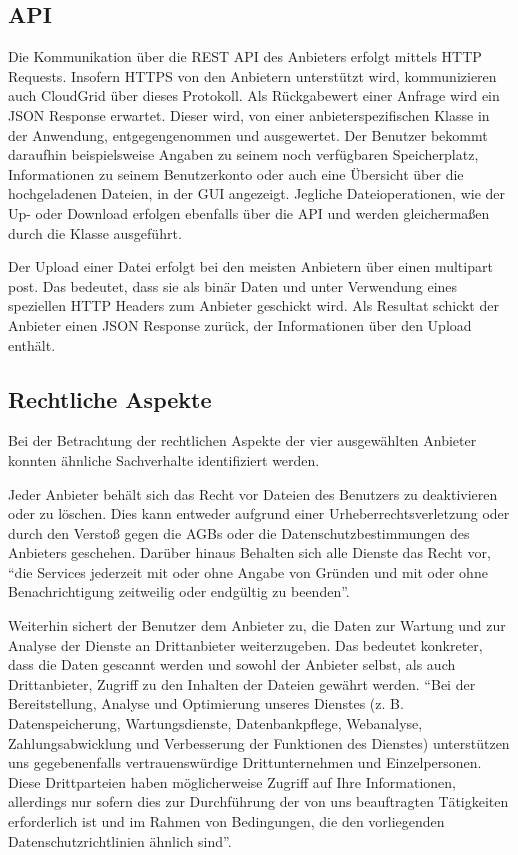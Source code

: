 \subsection{API}
\label{systementwurf-api}
Die Kommunikation über die \ac{REST} \ac{API} des Anbieters erfolgt mittels \ac{HTTP} Requests.
Insofern \ac{HTTPS} von den Anbietern unterstützt wird, kommunizieren auch CloudGrid über dieses Protokoll.
Als Rückgabewert einer Anfrage wird ein \ac{JSON} Response erwartet.
Dieser wird, von einer anbieterspezifischen Klasse in der Anwendung, entgegengenommen und ausgewertet.
Der Benutzer bekommt daraufhin beispielsweise Angaben zu seinem noch verfügbaren Speicherplatz, Informationen zu seinem Benutzerkonto oder auch eine Übersicht über die hochgeladenen Dateien, in der \ac{GUI} angezeigt.
Jegliche Dateioperationen, wie der Up- oder Download erfolgen ebenfalls über die \ac{API} und werden gleichermaßen durch die Klasse ausgeführt.

Der Upload einer Datei erfolgt bei den meisten Anbietern über einen \frqq multipart post\flqq\cite{multi95}.
Das bedeutet, dass sie als binär Daten und unter Verwendung eines speziellen \ac{HTTP} Headers zum Anbieter geschickt wird.
Als Resultat schickt der Anbieter einen JSON Response zurück, der Informationen über den Upload enthält.

\subsection{Rechtliche Aspekte}
\label{systementwurf-recht}
Bei der Betrachtung der rechtlichen Aspekte der vier ausgewählten Anbieter konnten ähnliche Sachverhalte identifiziert werden.

Jeder Anbieter behält sich das Recht vor Dateien des Benutzers zu deaktivieren oder zu löschen.
Dies kann entweder aufgrund einer Urheberrechtsverletzung oder durch den Verstoß gegen die \acp{AGB} oder die Datenschutzbestimmungen des Anbieters geschehen\cite[vgl.][]{box-terms, drop12, goog11, skyd12}.
Darüber hinaus Behalten sich alle Dienste das Recht vor, "`die Services jederzeit mit oder ohne Angabe von Gründen und mit oder ohne Benachrichtigung zeitweilig oder endgültig zu beenden"'\cite{drop12}.

Weiterhin sichert der Benutzer dem Anbieter zu, die Daten zur Wartung und zur Analyse der Dienste an Drittanbieter weiterzugeben\cite[vgl.][]{box-terms, drop13, goog11, skyd12}.
Das bedeutet konkreter, dass die Daten gescannt werden und sowohl der Anbieter selbst, als auch Drittanbieter, Zugriff zu den Inhalten der Dateien gewährt werden.
"`Bei der Bereitstellung, Analyse und Optimierung unseres Dienstes (z. B. Datenspeicherung, Wartungsdienste, Datenbankpflege, Webanalyse, Zahlungsabwicklung und Verbesserung der Funktionen des Dienstes) unterstützen uns gegebenenfalls vertrauenswürdige Drittunternehmen und Einzelpersonen. Diese Drittparteien haben möglicherweise Zugriff auf Ihre Informationen, allerdings nur sofern dies zur Durchführung der von uns beauftragten Tätigkeiten erforderlich ist und im Rahmen von Bedingungen, die den vorliegenden Datenschutzrichtlinien ähnlich sind"'\cite{drop12}.

